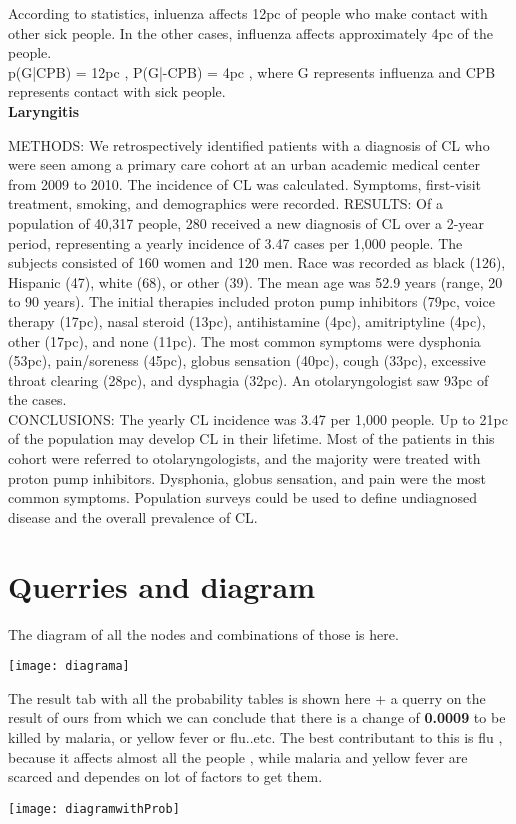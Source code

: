 \tab According to statistics, inluenza affects 12pc of people who make contact with other sick people. In the other cases, influenza affects approximately 4pc  of the people.\\
\tab \tab p(G|CPB) = 12pc , P(G|-CPB) = 4pc , where G represents influenza and CPB represents contact with sick people.\\


\textbf{Laryngitis}

METHODS: 
We retrospectively identified patients with a diagnosis of CL who were seen among a primary care cohort at an urban academic medical center from 2009 to 2010. The incidence of CL was calculated. Symptoms, first-visit treatment, smoking, and demographics were recorded.
RESULTS: 
Of a population of 40,317 people, 280 received a new diagnosis of CL over a 2-year period, representing a yearly incidence of 3.47 cases per 1,000 people. The subjects consisted of 160 women and 120 men. Race was recorded as black (126), Hispanic (47), white (68), or other (39). The mean age was 52.9 years (range, 20 to 90 years). The initial therapies included proton pump inhibitors (79pc, voice therapy (17pc), nasal steroid (13pc), antihistamine (4pc), amitriptyline (4pc), other (17pc), and none (11pc). The most common symptoms were dysphonia (53pc), pain/soreness (45pc), globus sensation (40pc), cough (33pc), excessive throat clearing (28pc), and dysphagia (32pc). An otolaryngologist saw 93pc of the cases.\\
CONCLUSIONS: 
The yearly CL incidence was 3.47 per 1,000 people. Up to 21pc of the population may develop CL in their lifetime. Most of the patients in this cohort were referred to otolaryngologists, and the majority were treated with proton pump inhibitors. Dysphonia, globus sensation, and pain were the most common symptoms. Population surveys could be used to define undiagnosed disease and the overall prevalence of CL.\\

\section {Querries and diagram}

\tab The diagram of all the nodes and combinations of those is here.\\

\begin{center}
  	\texttt{[image: diagrama]}
\end{center}

\tab The result tab with all the probability tables is shown here + a querry on the result of ours from which we can conclude that there is a change of \textbf{0.0009} to be killed by malaria, or yellow fever or flu..etc. The best contributant to this is flu , because it affects almost all the people , while malaria and yellow fever are scarced and dependes on lot of factors to get them.\\

\begin{center}
  	\texttt{[image: diagramwithProb]}
\end{center}
